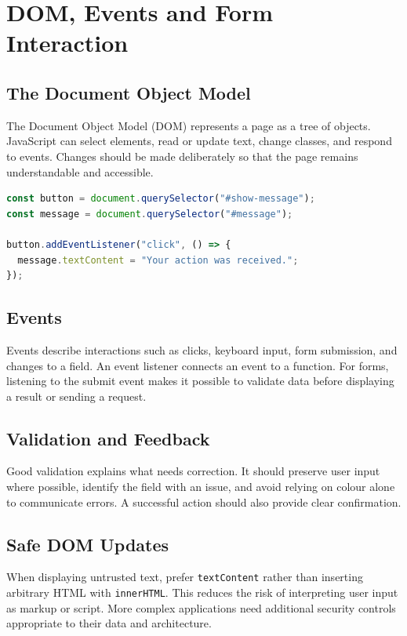 \documentclass[11pt,openany,oneside]{book}
\begin{document}
\chapter{DOM, Events and Form Interaction}
\section{The Document Object Model}
The Document Object Model (DOM) represents a page as a tree of objects. JavaScript can select elements, read or update text, change classes, and respond to events. Changes should be made deliberately so that the page remains understandable and accessible.

\begin{lstlisting}[style=webcode,language=JavaScript]
const button = document.querySelector("#show-message");
const message = document.querySelector("#message");

button.addEventListener("click", () => {
  message.textContent = "Your action was received.";
});
\end{lstlisting}

\section{Events}
Events describe interactions such as clicks, keyboard input, form submission, and changes to a field. An event listener connects an event to a function. For forms, listening to the submit event makes it possible to validate data before displaying a result or sending a request.

\section{Validation and Feedback}
Good validation explains what needs correction. It should preserve user input where possible, identify the field with an issue, and avoid relying on colour alone to communicate errors. A successful action should also provide clear confirmation.

\section{Safe DOM Updates}
When displaying untrusted text, prefer \texttt{textContent} rather than inserting arbitrary HTML with \texttt{innerHTML}. This reduces the risk of interpreting user input as markup or script. More complex applications need additional security controls appropriate to their data and architecture.
\end{document}
